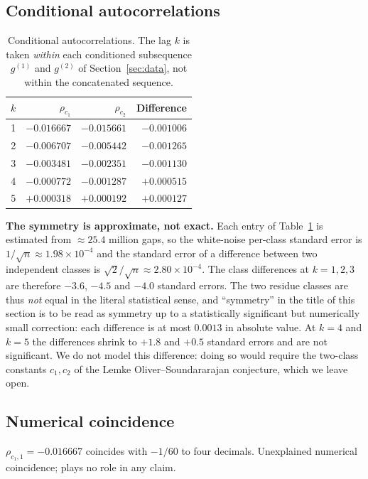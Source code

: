 \documentclass[11pt]{article}
\begin{document}
\subsection{Conditional autocorrelations}
\begin{table}[H]\centering
\caption{Conditional autocorrelations. The lag $k$ is taken
\emph{within} each conditioned subsequence $g^{(1)}$ and $g^{(2)}$ of
Section~\ref{sec:data}, not within the concatenated sequence.}
\label{tab:cond}
\begin{tabular}{rrrr}
\toprule
$k$ & $\rho_{c_1}$ & $\rho_{c_2}$ & Difference \\
\midrule
1  & $-0.016667$ & $-0.015661$ & $-0.001006$ \\
2  & $-0.006707$ & $-0.005442$ & $-0.001265$ \\
3  & $-0.003481$ & $-0.002351$ & $-0.001130$ \\
4  & $-0.000772$ & $-0.001287$ & $+0.000515$ \\
5  & $+0.000318$ & $+0.000192$ & $+0.000127$ \\
\bottomrule
\end{tabular}
\end{table}

\noindent\textbf{The symmetry is approximate, not exact.} Each entry of
Table~\ref{tab:cond} is estimated from $\approx 25.4$ million gaps, so
the white-noise per-class standard error is
$1/\sqrt{n} \approx 1.98 \times 10^{-4}$ and the standard error of a
difference between two independent classes is
$\sqrt{2}/\sqrt{n} \approx 2.80 \times 10^{-4}$. The class differences
at $k = 1, 2, 3$ are therefore $-3.6$, $-4.5$ and $-4.0$ standard
errors. The two residue classes are thus \emph{not} equal in the
literal statistical sense, and ``symmetry'' in the title of this
section is to be read as symmetry up to a statistically significant
but numerically small correction: each difference is at most
$0.0013$ in absolute value. At $k = 4$ and
$k = 5$ the differences shrink to $+1.8$ and $+0.5$ standard errors
and are not significant. We do not model this difference: doing so
would require the two-class constants $c_1, c_2$ of the
Lemke Oliver--Soundararajan conjecture, which we leave open.

\subsection{Numerical coincidence}
$\rho_{c_1, 1} = -0.016667$ coincides with $-1/60$ to four decimals.
Unexplained numerical coincidence; plays no role in any claim.
\end{document}
